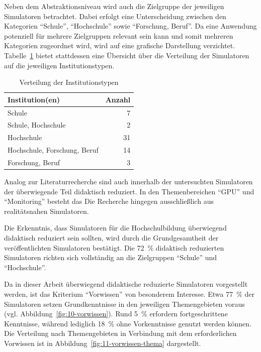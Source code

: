 Neben dem Abstraktionsniveau wird auch die Zielgruppe der jeweiligen Simulatoren betrachtet. Dabei erfolgt eine Unterscheidung zwischen den Kategorien \enquote{Schule}, \enquote{Hochschule} sowie \enquote{Forschung, Beruf}. Da eine Anwendung potenziell für mehrere Zielgruppen relevant sein kann und somit mehreren Kategorien zugeordnet wird, wird auf eine grafische Darstellung verzichtet. Tabelle~\ref{tab:institutionen} bietet stattdessen eine Übersicht über die Verteilung der Simulatoren auf die jeweiligen Institutionstypen.

\begin{table}[h]
	\centering
	\caption{Verteilung der Institutionstypen}
	\label{tab:institutionen}
	\begin{tabular}{l r}
		\toprule
		\textbf{Institution(en)} & \textbf{Anzahl} \\
		\midrule
		Schule                        & 7  \\
		Schule, Hochschule            & 2  \\
		Hochschule                    & 31 \\
		Hochschule, Forschung, Beruf  & 14 \\
		Forschung, Beruf              & 3  \\
		\bottomrule
	\end{tabular}
\end{table}

Analog zur Literaturrecherche sind auch innerhalb der untersuchten Simulatoren der überwiegende Teil didaktisch reduziert. In den Themenbereichen \enquote{GPU} und \enquote{Monitoring} besteht das Die Recherche hingegen ausschließlich aus realitätsnahen Simulatoren.

Die Erkenntnis, dass Simulatoren für die Hochschulbildung überwiegend didaktisch reduziert sein sollten, wird durch die Grundgesamtheit der veröffentlichten Simulatoren bestätigt. Die 72~\% didaktisch reduzierten Simulatoren richten sich vollständig an die Zielgruppen \enquote{Schule} und \enquote{Hochschule}.

Da in dieser Arbeit überwiegend didaktische reduzierte Simulatoren vorgestellt werden, ist das Kriterium \enquote{Vorwissen} von besonderem Interesse. Etwa 77~\% der Simulatoren setzen Grundkenntnisse in den jeweiligen Themengebieten voraus (vgl. Abbildung~\ref{fig:10-vorwissen}). Rund 5~\% erfordern fortgeschrittene Kenntnisse, während lediglich 18~\% ohne Vorkenntnisse genutzt werden können. Die Verteilung nach Themengebieten in Verbindung mit dem erforderlichen Vorwissen ist in Abbildung~\ref{fig:11-vorwissen-thema} dargestellt.

